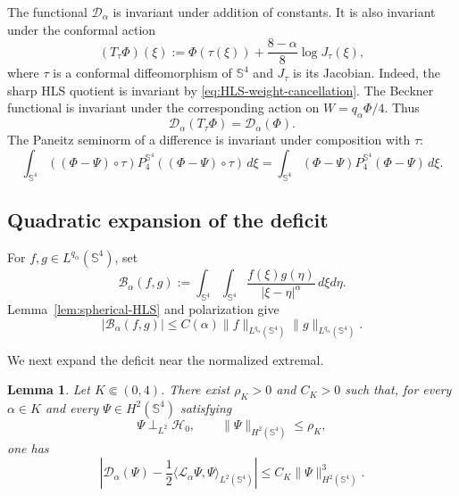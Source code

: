 \documentclass[11pt]{article}
\newtheorem{lemma}[theorem]{Lemma}
\numberwithin{equation}{section}
\begin{document}
The functional \(\mathcal D_{\alpha}\) is invariant under addition of constants. It is also invariant under the conformal action
\begin{equation*}
(T_{\tau}\Phi)(\xi)
:=\Phi(\tau(\xi))+\frac{8-\alpha}{8}\log J_{\tau}(\xi),
\end{equation*}
where \(\tau\) is a conformal diffeomorphism of \(\mathbb S^{4}\) and \(J_{\tau}\) is its Jacobian. Indeed, the sharp HLS quotient is invariant by \eqref{eq:HLS-weight-cancellation}. The Beckner functional is invariant under the corresponding action on \(W=q_{\alpha}\Phi/4\). Thus
\begin{equation}\label{eq:deficit-invariance}
\mathcal D_{\alpha}(T_{\tau}\Phi)=\mathcal D_{\alpha}(\Phi).
\end{equation}
The Paneitz seminorm of a difference is invariant under composition with \(\tau\):
\begin{equation}\label{eq:Paneitz-invariance}
\int_{\mathbb S^{4}}((\Phi-\Psi)\circ\tau)
P_{4}^{\mathbb S^{4}}((\Phi-\Psi)\circ\tau)\,d\xi
=\int_{\mathbb S^{4}}(\Phi-\Psi)
P_{4}^{\mathbb S^{4}}(\Phi-\Psi)\,d\xi.
\end{equation}

\subsection{Quadratic expansion of the deficit}

For \(f,g\in L^{q_{\alpha}}(\mathbb S^{4})\), set
\begin{equation*}
\mathcal B_{\alpha}(f,g)
:=\int_{\mathbb S^{4}}\int_{\mathbb S^{4}}
\frac{f(\xi)g(\eta)}{|\xi-\eta|^{\alpha}}\,d\xi d\eta.
\end{equation*}
Lemma~\ref{lem:spherical-HLS} and polarization give
\begin{equation}\label{eq:B-alpha-bound}
|\mathcal B_{\alpha}(f,g)|
\leq C(\alpha)\|f\|_{L^{q_{\alpha}}(\mathbb S^{4})}
\|g\|_{L^{q_{\alpha}}(\mathbb S^{4})}.
\end{equation}

We next expand the deficit near the normalized extremal.

\begin{lemma}\label{lem:deficit-expansion}
Let \(K\Subset(0,4)\). There exist \(\rho_{K}>0\) and \(C_{K}>0\) such that,
for every \(\alpha\in K\) and every \(\Psi\in H^{2}(\mathbb S^{4})\) satisfying
\begin{equation*}
\Psi\perp_{L^{2}}\mathcal H_{0},
\qquad
\|\Psi\|_{H^{2}(\mathbb S^{4})}\leq\rho_{K},
\end{equation*}
one has
\begin{equation}\label{eq:deficit-expansion}
\left|\mathcal D_{\alpha}(\Psi)
-\frac12\langle\mathcal L_{\alpha}\Psi,\Psi\rangle_{L^{2}(\mathbb S^{4})}\right|
\leq C_{K}\|\Psi\|_{H^{2}(\mathbb S^{4})}^{3}.
\end{equation}
\end{lemma}
\end{document}
